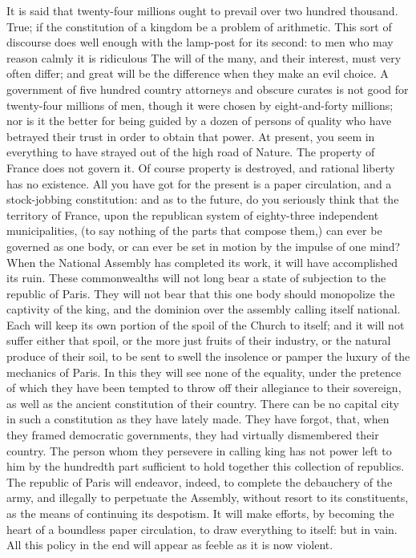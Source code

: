It is said that twenty-four millions ought to prevail over two hundred thousand. True; if the constitution of a kingdom be a problem of arithmetic. This sort of discourse does well enough with the lamp-post for its second: to men who may reason calmly it is ridiculous The will of the many, and their interest, must very often differ; and great will be the difference when they make an evil choice. A government of five hundred country attorneys and obscure curates is not good for twenty-four millions of men, though it were chosen by eight-and-forty millions; nor is it the better for being guided by a dozen of persons of quality who have betrayed their trust in order to obtain that power. At present, you seem in everything to have strayed out of the high road of Nature. The property of France does not govern it. Of course property is destroyed, and rational liberty has no existence. All you have got for the present is a paper circulation, and a stock-jobbing constitution: and as to the future, do you seriously think that the territory of France, upon the republican system of eighty-three independent municipalities, (to say nothing of the parts that compose them,) can ever be governed as one body, or can ever be set in motion by the impulse of one mind? When the National Assembly has completed its work, it will have accomplished its ruin. These commonwealths will not long bear a state of subjection to the republic of Paris. They will not bear that this one body should monopolize the captivity of the king, and the dominion over the assembly calling itself national. Each will keep its own portion of the spoil of the Church to itself; and it will not suffer either that spoil, or the more just fruits of their industry, or the natural produce of their soil, to be sent to swell the insolence or pamper the luxury of the mechanics of Paris. In this they will see none of the equality, under the pretence of which they have been tempted to throw off their allegiance to their sovereign, as well as the ancient constitution of their country. There can be no capital city in such a constitution as they have lately made. They have forgot, that, when they framed democratic governments, they had virtually dismembered their country. The person whom they persevere in calling king has not power left to him by the hundredth part sufficient to hold together this collection of republics. The republic of Paris will endeavor, indeed, to complete the debauchery of the army, and illegally to perpetuate the Assembly, without resort to its constituents, as the means of continuing its despotism. It will make efforts, by becoming the heart of a boundless paper circulation, to draw everything to itself: but in vain. All this policy in the end will appear as feeble as it is now violent.

